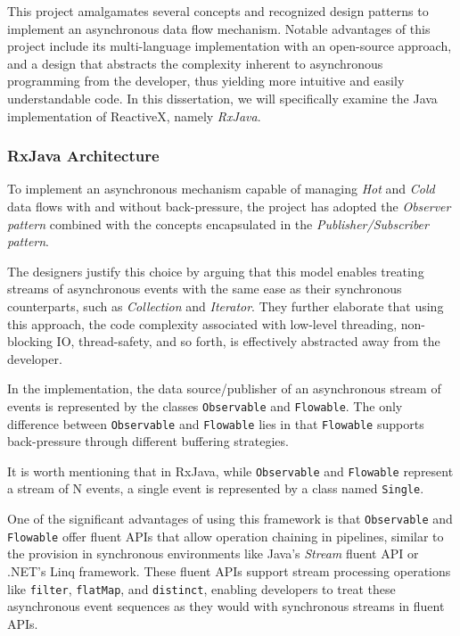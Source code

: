 This project amalgamates several concepts and recognized design patterns to implement an asynchronous data flow mechanism. Notable advantages of this project include its multi-language implementation with an open-source approach, and a design that abstracts the complexity inherent to asynchronous programming from the developer, thus yielding more intuitive and easily understandable code. In this dissertation, we will specifically examine the Java implementation of ReactiveX, namely \textit{RxJava}.

\clearpage

\subsubsection{RxJava Architecture}
\label{rxjava}
To implement an asynchronous mechanism capable of managing \textit{Hot} and \textit{Cold} data flows with and without back-pressure, the project has adopted the \textit{Observer pattern} combined with the concepts encapsulated in the \textit{Publisher/Subscriber pattern}. 

The designers justify this choice by arguing that this model enables treating streams of asynchronous events with the same ease as their synchronous counterparts, such as \textit{Collection} and \textit{Iterator}. They further elaborate that using this approach, the code complexity associated with low-level threading, non-blocking IO, thread-safety, and so forth, is effectively abstracted away from the developer.

In the implementation, the data source/publisher of an asynchronous stream of events is represented by the classes \texttt{Observable} and \texttt{Flowable}. The only difference between \texttt{Observable} and \texttt{Flowable} lies in that \texttt{Flowable} supports back-pressure through different buffering strategies.

It is worth mentioning that in RxJava, while \texttt{Observable} and \texttt{Flowable} represent a stream of N events, a single event is represented by a class named \texttt{Single}.

One of the significant advantages of using this framework is that \texttt{Observable} and \texttt{Flowable} offer fluent APIs that allow operation chaining in pipelines, similar to the provision in synchronous environments like Java's \textit{Stream} fluent API or .NET's Linq framework. These fluent APIs support stream processing operations like \texttt{filter}, \texttt{flatMap}, and \texttt{distinct}, enabling developers to treat these asynchronous event sequences as they would with synchronous streams in fluent APIs.

